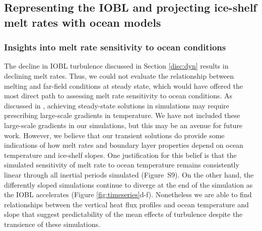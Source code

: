 \documentclass[tc, manuscript]{copernicus}
\begin{document}
\subsection{Representing the IOBL and projecting ice-shelf melt rates with ocean models}\label{disc:prm}

\subsubsection{Insights into melt rate sensitivity to ocean conditions}\label{disc:prm_sens}

The decline in IOBL turbulence discussed in Section \ref{disc:dyn} results in declining melt rates. Thus, we could not evaluate the relationship between melting and far-field conditions at steady state, which would have offered the most direct path to assessing melt rate sensitivity to ocean conditions. As discussed in \citet{jenkins_simple_2016}, achieving steady-state solutions in simulations may require prescribing large-scale gradients in temperature. We have not included these large-scale gradients in our simulations, but this may be an avenue for future work. However, we believe that our transient solutions do provide some indications of how melt rates and boundary layer properties depend on ocean temperature and ice-shelf slopes. One justification for this belief is that the simulated sensitivity of melt rate to ocean temperature remains consistently linear through all inertial periods simulated (Figure~S9). On the other hand, the differently sloped simulations continue to diverge at the end of the simulation as the IOBL accelerates (Figure \ref{fig:timeseries}d-f). Nonetheless we are able to find relationships between the vertical heat flux profiles and ocean temperature and slope that suggest predictability of the mean effects of turbulence despite the transience of these simulations.
\end{document}

